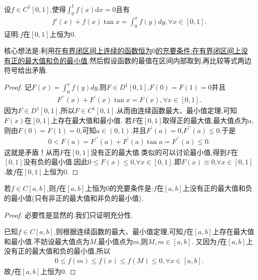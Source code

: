 \documentclass[lang=cn,newtx,10pt,scheme=chinese]{../Template/elegantbook}
\begin{document}
\begin{example}
设$f\in C^1\left[ 0,1 \right] $,使得$\int_0^1{f\left( x \right) \mathrm{d}x}=0$且有
\begin{align*}
f'\left( x \right) +f\left( x \right) \tan x=\int_0^x{f\left( y \right) dy,\forall x\in \left[ 0,1 \right] .}
\end{align*}
证明:$f$在$[0,1]$上恒为$0$.
\end{example}
\begin{note}
核心想法是:利用\hyperref[conclusion:在有界闭区间上连续的函数恒为$0$的充要条件:在有界闭区间上没有正的最大值和负的最小值]{在有界闭区间上连续的函数恒为$0$的充要条件:在有界闭区间上没有正的最大值和负的最小值}.然后假设函数的最值在区间内部取到,再比较等式两边符号给出矛盾.
\end{note}
\begin{proof}
记\(F(x) = \int_{0}^{x}f(y)dy\),则\(F \in D^1[0,1]\),\(F(0) = F(1) = 0\)并且
\begin{align*}
F^{\prime\prime}(x) + F^{\prime}(x)\tan x = F(x),\forall x \in [0,1].
\end{align*}
因为\(F \in D^1[0,1]\),所以\(F \in C^1[0,1]\).从而由连续函数最大、最小值定理,可知\(F(x)\)在\([0,1]\)上存在最大值和最小值.
若\(F\)在\([0,1]\)取得正的最大值,最大值点为\(a\),则由\(F(0) = F(1) = 0\),可知\(a \in (0,1)\).并且\(F^{\prime}(a) = 0\),\(F^{\prime\prime}(a) \leqslant 0\).于是
\begin{align*}
0 < F(a) = F^{\prime\prime}(a) + F^{\prime}(a)\tan a = F^{\prime\prime}(a) \leqslant 0.
\end{align*}
这就是矛盾！从而\(F\)在\([0,1]\)没有正的最大值.类似的可以讨论最小值,得到\(F\)在\([0,1]\)没有负的最小值.因此\(0 \leqslant F(x) \leqslant 0\),\(\forall x \in [0,1]\).即\(F(x) \equiv 0\),\(\forall x \in [0,1]\).故\(f\)在\([0,1]\)上恒为\(0\). 
\end{proof}
\begin{conclusion}\label{conclusion:在有界闭区间上连续的函数恒为$0$的充要条件:在有界闭区间上没有正的最大值和负的最小值}
若$f\in C[a,b]$,则$f$在$[a,b]$上恒为$0$的充要条件是:$f$在$[a,b]$上没有正的最大值和负的最小值(只有非正的最大值和非负的最小值).
\begin{proof}
必要性是显然的.我们只证明充分性.

已知$f\in C[a,b]$,则根据连续函数的最大、最小值定理,可知$f$在$[a,b]$上存在最大值和最小值.不妨设最大值点为$M$,最小值点为$m$,则$M,m\in[a,b]$.
又因为$f$在$[a,b]$上没有正的最大值和负的最小值,所以
\begin{align*}
0\leqslant  f(m)\leqslant  f(x)\leqslant  f(M)\leqslant  0,\forall x\in[a,b].
\end{align*}
故$f$在$[a,b]$上恒为$0$.
\end{proof}
\end{conclusion}
\end{document}
